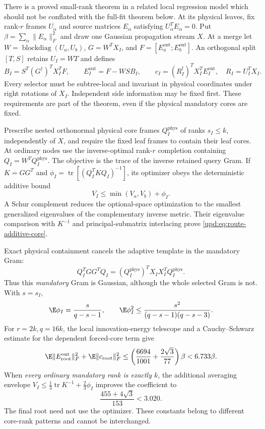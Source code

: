 \documentclass[11pt,oneside,openany,a4paper]{book}
\numberwithin{equation}{chapter}
\theoremstyle{definition}
\theoremstyle{remark}
\DeclareMathOperator{\tr}{tr}\DeclareMathOperator{\rank}{rank}
\DeclareMathOperator{\diag}{blockdiag}\DeclareMathOperator{\range}{range}
\begin{document}
There is a proved small-rank theorem in a related local regression
model which should not be conflated with the full-fit theorem below.
At its physical leaves, fix rank-$r$ frames $U_\alpha$ and source
matrices $E_\alpha$ satisfying $U_\alpha^TE_\alpha=0$.
Put $\beta=\sum_\alpha\lVert E_\alpha\rVert_F^2$ and draw one Gaussian
propagation stream $X$.  At a merge let $W=\diag(U_a,U_b)$,
$G=W^TX_I$, and $F=[E_a^{\mathrm{out}};E_b^{\mathrm{out}}]$.
An orthogonal split $[T,S]$ retains $U_I=WT$ and defines
\[
 B_I=S^T(G^\dagger)^TX_I^TF,\qquad
 E_I^{\mathrm{out}}=F-WSB_I,\qquad
 c_I=(R_I^\dagger)^TX_I^TE_I^{\mathrm{out}},
 \quad R_I=U_I^TX_I.
\]
Every selector must be subtree-local and invariant in physical
coordinates under right rotations of $X_I$.  Independent side
information may be fixed first.  These requirements are part of the
theorem, even if the physical mandatory cores are fixed.

Prescribe nested orthonormal physical core frames $Q_I^{\mathrm{phys}}$
of ranks $s_I\leq k$, independently of $X$, and require the fixed leaf
frames to contain their leaf cores.  At ordinary nodes use the
inverse-optimal rank-$r$ completion containing
$Q_I=W^TQ_I^{\mathrm{phys}}$.  The objective is the trace of the inverse
retained query Gram.  If $K=GG^T$ and
$\phi_I=\tr[(Q_I^TKQ_I)^{-1}]$, its optimizer obeys the deterministic
additive bound
\begin{equation}
 V_I\leq\min(V_a,V_b)+\phi_I.
 \label{upd:eq:route-additive-core}
\end{equation}
A Schur complement reduces the optional-space optimization to the
smallest generalized eigenvalues of the complementary inverse metric.
Their eigenvalue comparison with $K^{-1}$ and principal-submatrix
interlacing prove \eqref{upd:eq:route-additive-core}.

Exact physical containment cancels the adaptive template in the
mandatory Gram:
\[
 Q_I^TGG^TQ_I
 =(Q_I^{\mathrm{phys}})^TX_IX_I^TQ_I^{\mathrm{phys}}.
\]
Thus this \emph{mandatory} Gram is Gaussian, although the whole selected
Gram is not.  With $s=s_I$,
\[
 \E\phi_I=\frac{s}{q-s-1},\qquad
 \E\phi_I^2\leq\frac{s^2}{(q-s-1)(q-s-3)}.
\]
For $r=2k,q=16k$, the local innovation-energy telescope and a
Cauchy--Schwarz estimate for the dependent forced-core term give
\begin{equation}
 \E\lVert E_{\mathrm{root}}^{\mathrm{out}}\rVert_F^2
 +\E\lVert c_{\mathrm{root}}\rVert_F^2
 \leq\left(\frac{6694}{1001}+\frac{2\sqrt3}{77}\right)\beta
 <6.733\beta.
 \label{upd:eq:route-fixed-core}
\end{equation}
When \emph{every ordinary mandatory rank is exactly $k$}, the additional
averaging envelope
$V_I\leq\tfrac13\tr K^{-1}+\tfrac23\phi_I$ improves the coefficient to
\begin{equation}
 \frac{455+4\sqrt3}{153}<3.020.
 \label{upd:eq:route-half-core}
\end{equation}
The final root need not use the optimizer.  These constants belong to
different core-rank patterns and cannot be interchanged.
\end{document}
